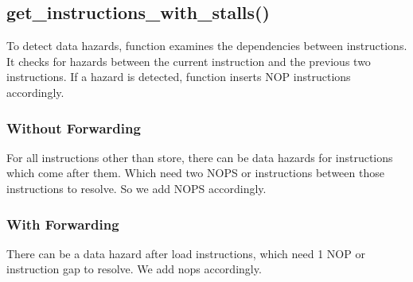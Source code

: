 \documentclass{article}
\begin{document}
\subsection{get\_instructions\_with\_stalls()}
To detect data hazards, function examines the dependencies between instructions. It checks for hazards between the current instruction and the previous two instructions. If a hazard is detected, function inserts NOP instructions accordingly.

\subsubsection{Without Forwarding}
For all instructions other than store, there can be data hazards for instructions which come after them. Which need two NOPS or instructions between those instructions to resolve. So we add NOPS accordingly.

\subsubsection{With Forwarding}
There can be a data hazard after load instructions, which need 1 NOP or instruction gap to resolve. We add nops accordingly.
\end{document}
